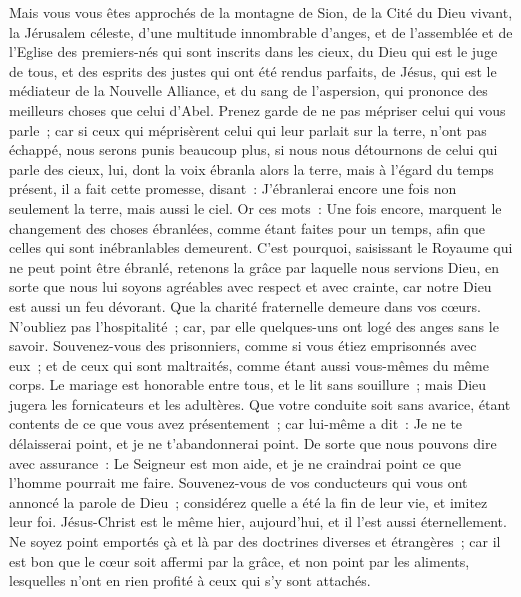 \begin{multicols}{2}
Mais vous vous êtes approchés de la montagne de Sion, de la Cité du Dieu vivant, la Jérusalem céleste, d'une multitude innombrable d'anges,
et de l'assemblée et de l'Eglise des premiers-nés qui sont inscrits dans les cieux, du Dieu qui est le juge de tous, et des esprits des justes qui ont été rendus parfaits,
de Jésus, qui est le médiateur de la Nouvelle Alliance, et du sang de l'aspersion, qui prononce des meilleurs choses que celui d'Abel.
Prenez garde de ne pas mépriser celui qui vous parle~; car si ceux qui méprisèrent celui qui leur parlait sur la terre, n'ont pas échappé, nous serons punis beaucoup plus, si nous nous détournons de celui qui parle des cieux,
lui, dont la voix ébranla alors la terre, mais à l'égard du temps présent, il a fait cette promesse, disant~: J'ébranlerai encore une fois non seulement la terre, mais aussi le ciel.
Or ces mots~: Une fois encore, marquent le changement des choses ébranlées, comme étant faites pour un temps, afin que celles qui sont inébranlables demeurent.
C'est pourquoi, saisissant le Royaume qui ne peut point être ébranlé, retenons la grâce par laquelle nous servions Dieu, en sorte que nous lui soyons agréables avec respect et avec crainte,
car notre Dieu est aussi un feu dévorant.
\VerseOne{}Que la charité fraternelle demeure dans vos cœurs.
N'oubliez pas l'hospitalité~; car, par elle quelques-uns ont logé des anges sans le savoir.
Souvenez-vous des prisonniers, comme si vous étiez emprisonnés avec eux~; et de ceux qui sont maltraités, comme étant aussi vous-mêmes du même corps.
Le mariage est honorable entre tous, et le lit sans souillure~; mais Dieu jugera les fornicateurs et les adultères.
Que votre conduite soit sans avarice, étant contents de ce que vous avez présentement~; car lui-même a dit~: Je ne te délaisserai point, et je ne t'abandonnerai point.
De sorte que nous pouvons dire avec assurance~: Le Seigneur est mon aide, et je ne craindrai point ce que l'homme pourrait me faire.
Souvenez-vous de vos conducteurs qui vous ont annoncé la parole de Dieu~; considérez quelle a été la fin de leur vie, et imitez leur foi.
Jésus-Christ est le même hier, aujourd'hui, et il l'est aussi éternellement.
Ne soyez point emportés çà et là par des doctrines diverses et étrangères~; car il est bon que le cœur soit affermi par la grâce, et non point par les aliments, lesquelles n'ont en rien profité à ceux qui s'y sont attachés.

\end{multicols}
